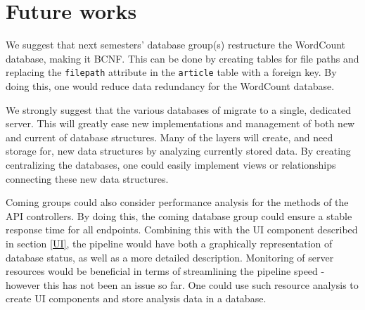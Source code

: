 \section{Future works}
We suggest that next semesters' database group(s) restructure the WordCount database, making it BCNF. 
This can be done by creating tables for file paths and replacing the \texttt{filepath} attribute in the \texttt{article} table with a foreign key.
By doing this, one would reduce data redundancy for the WordCount database. 

We strongly suggest that the various databases of \knox{} migrate to a single, dedicated server.
This will greatly ease new implementations and management of both new and current of database structures.
Many of the layers will create, and need storage for, new data structures by analyzing currently stored data.
By creating centralizing the \knox{} databases, one could easily implement views or relationships connecting these new data structures.

Coming groups could also consider performance analysis for the methods of the API controllers. 
By doing this, the coming database group could ensure a stable response time for all endpoints.
Combining this with the UI component described in section \ref{UI}, the pipeline would have both a graphically representation of database status, as well as a more detailed description.
Monitoring of server resources would be beneficial in terms of streamlining the pipeline speed - however this has not been an issue so far.
One could use such resource analysis to create UI components and store analysis data in a database.

